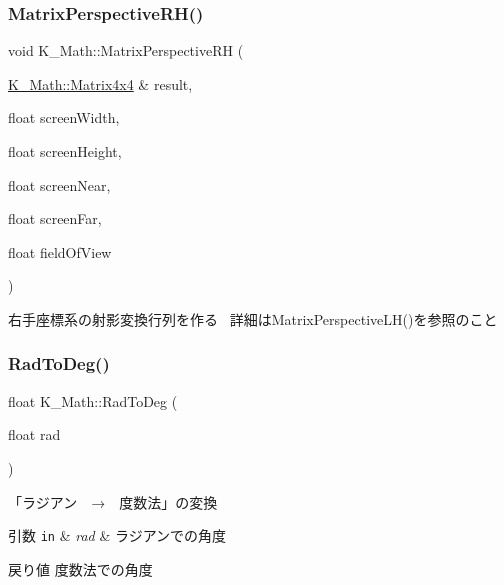 \subsubsection{\texorpdfstring{Matrix\+Perspective\+R\+H()}{MatrixPerspectiveRH()}}
{\footnotesize\ttfamily void K\+\_\+\+Math\+::\+Matrix\+Perspective\+RH (\begin{DoxyParamCaption}\item[{\mbox{\hyperlink{namespace_k___math_a345271af9d32dff2c964bc679b13b45c}{K\+\_\+\+Math\+::\+Matrix4x4}} \&}]{result,  }\item[{float}]{screen\+Width,  }\item[{float}]{screen\+Height,  }\item[{float}]{screen\+Near,  }\item[{float}]{screen\+Far,  }\item[{float}]{field\+Of\+View }\end{DoxyParamCaption})}



右手座標系の射影変換行列を作る~\newline
詳細は\+Matrix\+Perspective\+L\+H()を参照のこと 

\mbox{\label{namespace_k___math_a4ab382b67d996b4862e30be45875740d}} 
\subsubsection{\texorpdfstring{Rad\+To\+Deg()}{RadToDeg()}}
{\footnotesize\ttfamily float K\+\_\+\+Math\+::\+Rad\+To\+Deg (\begin{DoxyParamCaption}\item[{float}]{rad }\end{DoxyParamCaption})}



「ラジアン　→　度数法」の変換 


\begin{DoxyParams}[1]{引数}
\mbox{\tt in}  & {\em rad} & ラジアンでの角度 \\
\hline
\end{DoxyParams}
\begin{DoxyReturn}{戻り値}
度数法での角度 
\end{DoxyReturn}
